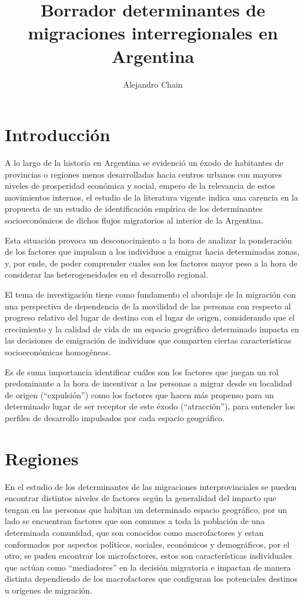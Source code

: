 \documentclass[12pt,a4paper]{article}
\author{Alejandro Chain}
\title{Borrador determinantes de migraciones interregionales en Argentina}
\begin{document}
\maketitle
\tableofcontents
\newpage
\section{Introducción}
A lo largo de la historia en Argentina se evidenció un éxodo de habitantes de provincias o
regiones menos desarrolladas hacia centros urbanos con mayores niveles de prosperidad económica y social, empero de la relevancia de estos movimientos internos, el estudio de la literatura vigente indica una carencia en la propuesta de un estudio de identificación empírica de los determinantes socioeconómicos de dichos flujos migratorios al interior de la Argentina.

Esta situación provoca un desconocimiento a la hora de analizar la ponderación de los factores que impulsan a los individuos a emigrar hacia determinadas zonas, y, por ende, de poder comprender cuales son los factores mayor peso a la hora de considerar las heterogeneidades en el desarrollo regional.

El tema de investigación tiene como fundamento el abordaje de la migración con una perspectiva de dependencia de la movilidad de las personas con respecto al progreso relativo del lugar de destino con el lugar de origen, considerando que el crecimiento y la calidad de vida de un espacio geográfico determinado impacta en las decisiones de emigración de individuos que comparten ciertas características socioeconómicas homogéneas.

Es de suma importancia identificar cuáles son los factores que juegan un rol predominante a la hora de incentivar a las personas a migrar desde su localidad de origen (“expulsión”) como los factores que hacen más propenso para un determinado lugar de ser receptor de este éxodo (“atracción”), para entender los perfiles de desarrollo impulsados por cada espacio geográfico.

\section{Regiones}
En el estudio de los determinantes de las migraciones interprovinciales se pueden encontrar distintos niveles de factores según la generalidad del impacto que tengan en las personas que habitan un determinado espacio geográfico, por un lado se encuentran factores que son comunes a toda la población de una determinada comunidad, que son conocidos como macrofactores y estan conformados por aspectos políticos, sociales, económicos y demográficos, por el otro, se puden encontrar los microfactores, estos son características individuales que actúan como “mediadores” en la decisión migratoria e impactan de manera distinta dependiendo de los macrofactores que configuran los potenciales destinos u orígenes de migración.
\end{document}
